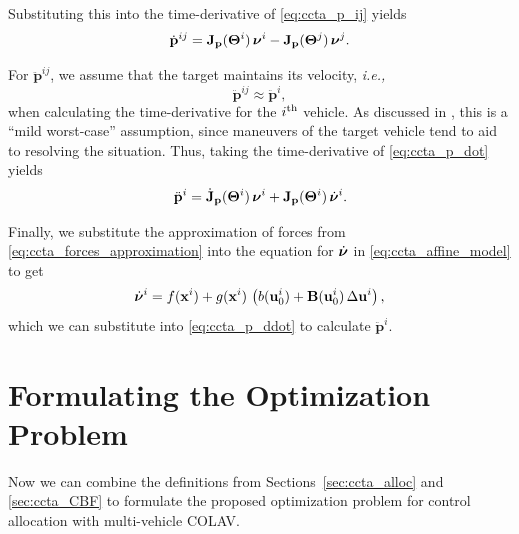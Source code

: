 \noindent Substituting this into the time-derivative of \eqref{eq:ccta_p_ij} yields
\begin{equation}
    \dot{\mathbf{p}}^{ij} = \mathbf{J}_{\mathbf{p}}(\bm{\Theta}^{i}) \, \bm{\nu}^{i} - \mathbf{J}_{\mathbf{p}}(\bm{\Theta}^{j}) \, \bm{\nu}^{j}.
    \label{eq:ccta_p_dot}
\end{equation}

\noindent For $\ddot{\mathbf{p}}^{ij}$, we assume that the target maintains its velocity, \emph{i.e.,}
\begin{equation}
    \ddot{\mathbf{p}}^{ij} \approx \ddot{\mathbf{p}}^{i},
\end{equation}
when calculating the time-derivative for the $i^{\rm th}$ vehicle.
As discussed in \cite{thyri_reactive_2020}, this is a ``mild worst-case'' assumption, since maneuvers of the target vehicle tend to aid to resolving the situation.
Thus, taking the time-derivative of \eqref{eq:ccta_p_dot} yields
\begin{equation}
    \ddot{\mathbf{p}}^{i} = \dot{\mathbf{J}}_{\mathbf{p}}(\bm{\Theta}^{i}) \, \bm{\nu}^{i} + \mathbf{J}_{\mathbf{p}}(\bm{\Theta}^{i}) \, \dot{\bm{\nu}}^{i}.
    \label{eq:ccta_p_ddot}
\end{equation}

Finally, we substitute the approximation of forces from \eqref{eq:ccta_forces_approximation} into the equation for $\dot{\bm{\nu}}$ in \eqref{eq:ccta_affine_model} to get
\begin{equation}
    \dot{\bm{\nu}}^{i} = f(\mathbf{x}^{i}) + g(\mathbf{x}^{i})\,\left(b(\mathbf{u}_0^{i}) + \mathbf{B}(\mathbf{u}_0^{i})\,\Delta\mathbf{u}^{i}\right),
\end{equation}
which we can substitute into \eqref{eq:ccta_p_ddot} to calculate $\ddot{\mathbf{p}}^{i}$.

\section{Formulating the Optimization Problem}
\label{sec:ccta_optimization}
Now we can combine the definitions from Sections~\ref{sec:ccta_alloc} and \ref{sec:ccta_CBF} to formulate the proposed optimization problem for control allocation with multi-vehicle COLAV.

